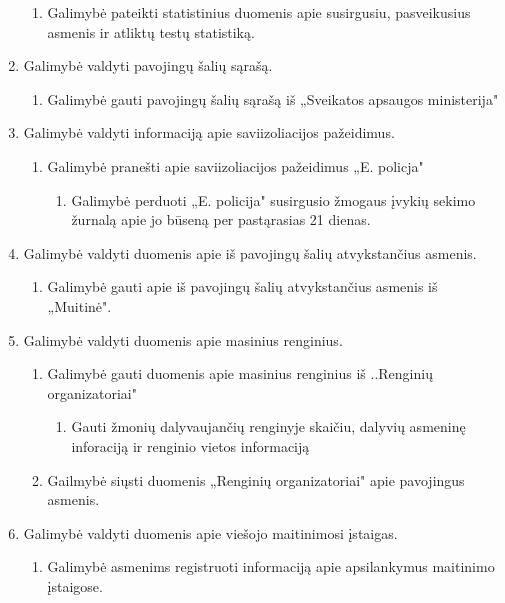 \documentclass{VUMIFPSkursinis}
\begin{document}
\begin{enumerate}
\begin{enumerate}
		      \item{Galimybė pateikti statistinius duomenis apie susirgusiu, pasveikusius asmenis ir atliktų testų statistiką.}
	      \end{enumerate}
	\item{Galimybė valdyti pavojingų šalių sąrašą.}
	      \begin{enumerate}
		      \item{Galimybė gauti pavojingų šalių sąrašą iš „Sveikatos apsaugos ministerija"}
	      \end{enumerate}
	\item{Galimybė valdyti informaciją apie saviizoliacijos pažeidimus.}
	      \begin{enumerate}
		      \item{Galimybė pranešti apie saviizoliacijos pažeidimus „E. policja"}
		            \begin{enumerate}
			            \item{Galimybė perduoti „E. policija" susirgusio žmogaus įvykių sekimo žurnalą apie jo būseną per pastąrasias 21 dienas.}
		            \end{enumerate}
	      \end{enumerate}
	\item{Galimybė valdyti duomenis apie iš pavojingų šalių atvykstančius asmenis.}
	      \begin{enumerate}
		      \item{Galimybė gauti apie iš pavojingų šalių atvykstančius asmenis iš „Muitinė".}
	      \end{enumerate}
	\item{Galimybė valdyti duomenis apie masinius renginius.}
	      \begin{enumerate}
		      \item{Galimybė gauti duomenis apie masinius renginius iš ..Renginių organizatoriai"}
		            \begin{enumerate}
			            \item{Gauti žmonių dalyvaujančių renginyje skaičiu, dalyvių asmeninę inforaciją ir renginio vietos informaciją}
		            \end{enumerate}
		      \item{Gailmybė siųsti duomenis „Renginių organizatoriai" apie pavojingus asmenis.}
	      \end{enumerate}
	\item{Galimybė valdyti duomenis apie viešojo maitinimosi įstaigas.}
	      \begin{enumerate}
		      \item{Galimybė asmenims registruoti informaciją apie apsilankymus maitinimo įstaigose.}

\end{enumerate}
\end{enumerate}
\end{document}
